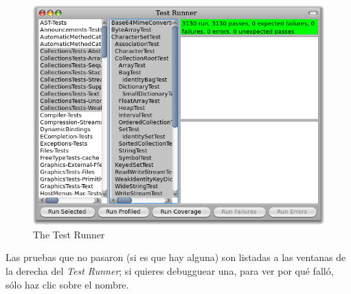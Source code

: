 \documentclass[a4paper,10pt,twoside]{book}
\begin{document}
\begin{figure}[tbh]
  \begin{center}
	\includegraphics[width=\linewidth]{test-runner}
	\caption{The \pharo \sunit Test Runner}
  \end{center}
\end{figure}





Las pruebas que no pasaron (si es que hay alguna) son listadas a las ventanas de la derecha del \emph{Test Runner};
si quieres debugguear una, para ver por qu\'e fall\'o, s\'olo haz clic sobre el nombre.
\end{document}
